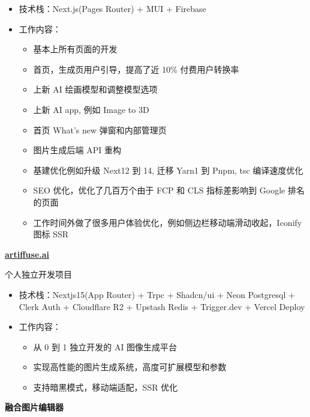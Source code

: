 \begin{itemize}
\item 技术栈：Next.js(Pages Router) + MUI + Firebase
\item 工作内容：
  \begin{itemize}
    \item 基本上所有页面的开发
    \item 首页，生成页用户引导，提高了近 10\% 付费用户转换率
    \item 上新 AI 绘画模型和调整模型选项
    \item 上新 AI app, 例如 Image to 3D
    \item 首页 What's new 弹窗和内部管理页
    \item 图片生成后端 API 重构
    \item 基建优化例如升级 Next12 到 14, 迁移 Yarn1 到 Pnpm, tsc 编译速度优化
    \item SEO 优化，优化了几百万个由于 FCP 和 CLS 指标差影响到 Google 排名的页面
    \item 工作时间外做了很多用户体验优化，例如侧边栏移动端滑动收起，Iconify 图标 SSR
  \end{itemize}
\end{itemize}


\textbf{\href{https://artiffuse.ai}{artiffuse.ai}}

\vspace{10pt}

个人独立开发项目

\begin{itemize}
\item
  技术栈：Nextjs15(App Router) + Trpc + Shadcn/ui + Neon Postgresql + Clerk Auth + Cloudflare R2 + Upstash Redis + Trigger.dev + Vercel Deploy
\item 工作内容：
  \begin{itemize}
    \item 从 0 到 1 独立开发的 AI 图像生成平台
    \item 实现高性能的图片生成系统，高度可扩展模型和参数
    \item 支持暗黑模式，移动端适配，SSR 优化
  \end{itemize}
\end{itemize}

\textbf{融合图片编辑器}

\vspace{10pt}


